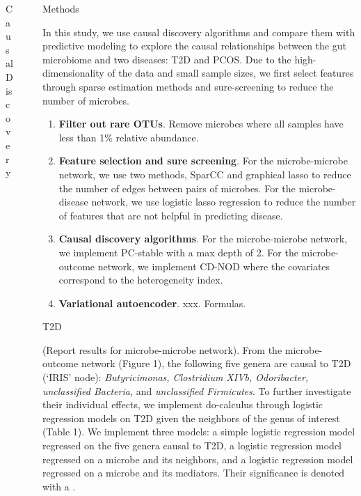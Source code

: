 \documentclass[final]{beamer}
\newlength{\sepwidth}
\newlength{\colwidth}
\newcommand{\separatorcolumn}{\begin{column}{\sepwidth}\end{column}}
\begin{document}
\begin{frame}[t]
\begin{columns}[t]
\begin{column}{\colwidth}
\begin{alertblock}{Causal Discovery}
	  \end{alertblock}

\end{column}

\separatorcolumn

\begin{column}{\colwidth}

  \begin{block}{Methods}

   In this study, we use causal discovery algorithms and compare them with 
   predictive modeling to explore the causal relationships between the 
   gut microbiome and two diseases: T2D and PCOS. Due to the high-dimensionality
   of the data and small sample sizes, we first select features through sparse
   estimation methods and sure-screening to reduce the number of microbes. 

    \begin{enumerate}
      \item \textbf{Filter out rare OTUs}. Remove microbes where all samples have less than 1\%
      relative abundance. 
      \item \textbf{Feature selection and sure screening}. For the microbe-microbe network, we use two 
      methods, SparCC \cite{friedman2012sparcc} and graphical lasso to reduce the number of edges between pairs of microbes.
      For the microbe-disease network, we use logistic lasso regression to reduce the number of 
      features that are not helpful in predicting disease. 
      \item \textbf{Causal discovery algorithms}. For the microbe-microbe network, we implement
      PC-stable with a max depth of 2. For the microbe-outcome network, we implement CD-NOD
      where the covariates correspond to the heterogeneity index. 
      \item \textbf{Variational autoencoder}. xxx. Formulas.
    \end{enumerate}

  \end{block}

  \begin{block}{T2D}

    (Report results for microbe-microbe network). From the microbe-outcome network (Figure 1), the following five genera are causal to T2D (`IRIS' node): \textit{Butyricimonas, Clostridium XIVb, Odoribacter, unclassified Bacteria,} and \textit{unclassified Firmicutes}. To further investigate their individual effects, we implement do-calculus through logistic regression models on T2D given the neighbors of the genus of interest (Table 1). We implement three models: a simple logistic regression model regressed on the five genera causal to T2D, a logistic regression model regressed on a microbe and its neighbors, and a logistic regression model regressed on a microbe and its mediators. Their significance is denoted with a \*. 


\end{block}
\end{column}
\end{columns}
\end{frame}
\end{document}
